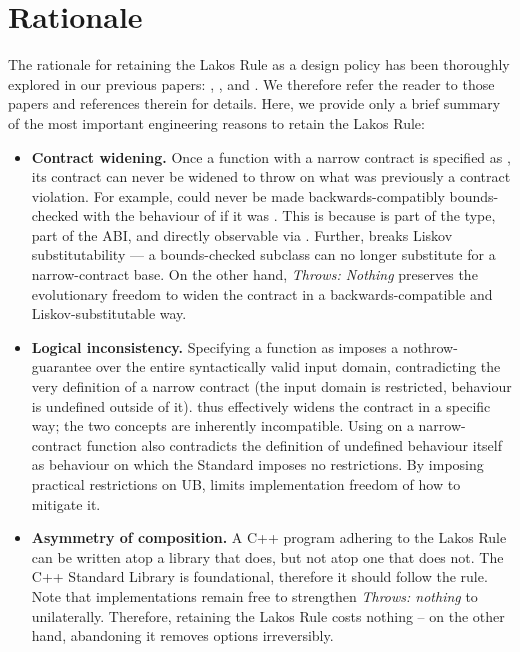 
\section{Rationale}
\label{sec:rationale}

The rationale for retaining the Lakos Rule as a design policy has been thoroughly explored in our previous papers: \cite{P2831R0}, \cite{P2861R0}, and \cite{P3005R0}. We therefore refer the reader to those papers and references therein for details. Here, we provide only a brief summary of the most important engineering reasons to retain the Lakos Rule:

\begin{itemize}
\item \textbf{Contract widening.} Once a function with a narrow contract is specified as , its contract can never be widened to throw on what was previously a contract violation. For example,  could never be made backwards-compatibly bounds-checked with the behaviour of  if it was . This is because  is part of the type, part of the ABI, and directly observable via . Further,  breaks Liskov substitutability — a bounds-checked subclass can no longer substitute for a narrow-contract base. On the other hand, \emph{Throws: Nothing} preserves the evolutionary freedom to widen the contract in a backwards-compatible and Liskov-substitutable way.
\item \textbf{Logical inconsistency.} Specifying a function as  imposes a nothrow-guarantee over the entire syntactically valid input domain, contradicting the very definition of a narrow contract (the input domain is restricted, behaviour is undefined outside of it).  thus effectively widens the contract in a specific way; the two concepts are inherently incompatible. Using  on a narrow-contract function also contradicts the definition of undefined behaviour itself as behaviour on which the Standard imposes no restrictions. By imposing practical restrictions on UB,  limits implementation freedom of how to mitigate it.
\item \textbf{Asymmetry of composition.} A C++ program adhering to the Lakos Rule can be written atop a library that does, but not atop one that does not. The C++ Standard Library is foundational, therefore it should follow the rule. Note that implementations remain free to strengthen \emph{Throws: nothing} to  unilaterally. Therefore, retaining the Lakos Rule costs nothing -- on the other hand, abandoning it removes options irreversibly.

\end{itemize}
